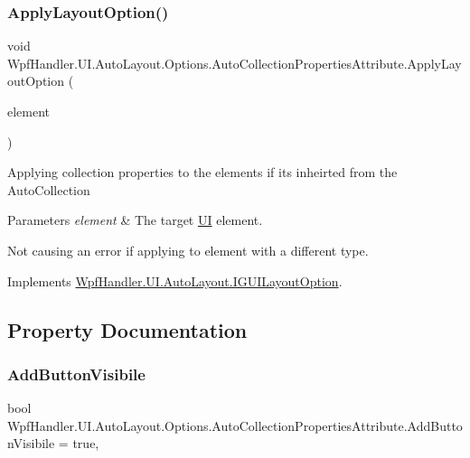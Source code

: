 \subsubsection{\texorpdfstring{Apply\+Layout\+Option()}{ApplyLayoutOption()}}
{\footnotesize\ttfamily void Wpf\+Handler.\+U\+I.\+Auto\+Layout.\+Options.\+Auto\+Collection\+Properties\+Attribute.\+Apply\+Layout\+Option (\begin{DoxyParamCaption}\item[{Framework\+Element}]{element }\end{DoxyParamCaption})}



Applying collection properties to the elements if it\textquotesingle{}s inheirted from the Auto\+Collection 


\begin{DoxyParams}{Parameters}
{\em element} & The target \mbox{\hyperlink{namespace_wpf_handler_1_1_u_i}{UI}} element.\\
\hline
\end{DoxyParams}


Not causing an error if applying to element with a different type. 

Implements \mbox{\hyperlink{interface_wpf_handler_1_1_u_i_1_1_auto_layout_1_1_i_g_u_i_layout_option_ac2d2fa8aeaf753b3248381399f991005}{Wpf\+Handler.\+U\+I.\+Auto\+Layout.\+I\+G\+U\+I\+Layout\+Option}}.



\subsection{Property Documentation}
\mbox{\label{class_wpf_handler_1_1_u_i_1_1_auto_layout_1_1_options_1_1_auto_collection_properties_attribute_aa93230d17f835aa86a64d12914ac482e}} 
\subsubsection{\texorpdfstring{Add\+Button\+Visibile}{AddButtonVisibile}}
{\footnotesize\ttfamily bool Wpf\+Handler.\+U\+I.\+Auto\+Layout.\+Options.\+Auto\+Collection\+Properties\+Attribute.\+Add\+Button\+Visibile = true\hspace{0.3cm}{\ttfamily [get]}, {\ttfamily [set]}}



